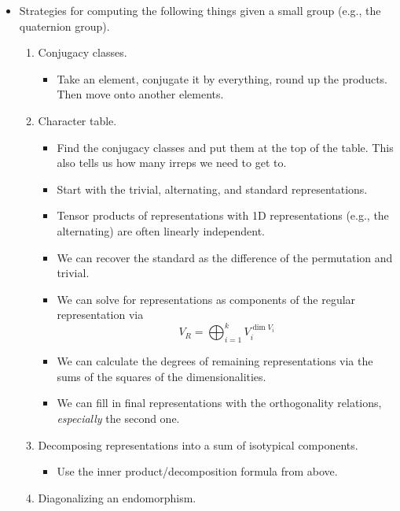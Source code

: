 \documentclass[../notes.tex]{subfiles}
\begin{document}
\begin{itemize}
\begin{enumerate}
    \end{enumerate}
    \item Strategies for computing the following things given a small group (e.g., the quaternion group).
    \begin{enumerate}
        \item Conjugacy classes.
        \begin{itemize}
            \item Take an element, conjugate it by everything, round up the products. Then move onto another elements.
        \end{itemize}
        \item Character table.
        \begin{itemize}
            \item Find the conjugacy classes and put them at the top of the table. This also tells us how many irreps we need to get to.
            \item Start with the trivial, alternating, and standard representations.
            \item Tensor products of representations with 1D representations (e.g., the alternating) are often linearly independent.
            \item We can recover the standard as the difference of the permutation and trivial.
            \item We can solve for representations as components of the regular representation via
            \begin{equation*}
                V_R = \bigoplus_{i=1}^kV_i^{\dim V_i}
            \end{equation*}
            \item We can calculate the degrees of remaining representations via the sums of the squares of the dimensionalities.
            \item We can fill in final representations with the orthogonality relations, \emph{especially} the second one.
        \end{itemize}
        \item Decomposing representations into a sum of isotypical components.
        \begin{itemize}
            \item Use the inner product/decomposition formula from above.
        \end{itemize}
        \item Diagonalizing an endomorphism.
        \begin{itemize}

\end{itemize}
\end{enumerate}
\end{itemize}
\end{document}
